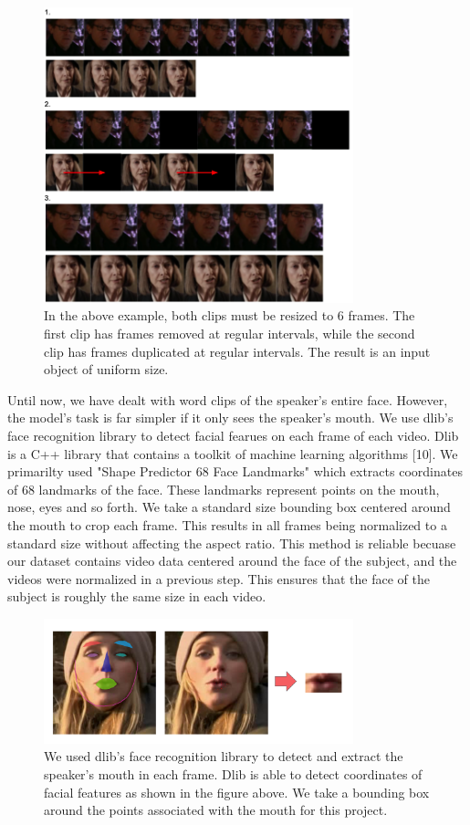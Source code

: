 \documentclass{article}
\begin{document}
   \begin{figure}[h!]
 \centering
  \includegraphics[width=0.8\textwidth]{sampling}
 \caption{In the above example, both clips must be resized to 6 frames. The first clip has frames removed at regular intervals, while the second clip has frames duplicated at regular intervals. The result is an input object of uniform size.}
 \end{figure}

Until now, we have dealt with word clips of the speaker's entire face. However, the model's task is far simpler if it only sees the speaker's mouth. We use dlib's face recognition library to detect facial fearues on each frame of each video. Dlib is a C++ library that contains a toolkit of machine learning algorithms [10]. We primarilty used "Shape Predictor 68 Face Landmarks" which extracts coordinates of 68 landmarks of the face. These landmarks represent points on the mouth, nose, eyes and so forth. We take a standard size bounding box centered around the mouth to crop each frame. This results in all frames being normalized to a standard size without affecting the aspect ratio. This method is reliable becuase our dataset contains video data centered around the face of the subject, and the videos were normalized in a previous step. This ensures that the face of the subject is roughly the same size in each video.

   \begin{figure}[h!]
 \centering
  \includegraphics[width=0.8\textwidth]{dlib}
 \caption{We used dlib's face recognition library to detect and extract the speaker's mouth in each frame. Dlib is able to detect coordinates of facial features as shown in the figure above. We take a bounding box around the points associated with the mouth for this project.}
 \end{figure}
\end{document}
